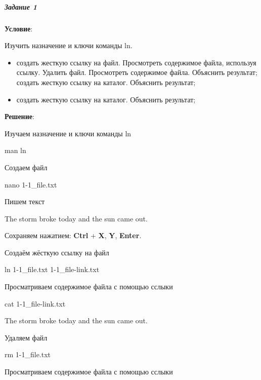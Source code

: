 \subparagraph{Задание 1} \textbf{Условие}:

Изучить назначение и ключи команды ln.

\begin{itemize}
    \item создать жесткую ссылку на файл. Просмотреть содержимое файла, используя
ссылку. Удалить файл. Просмотреть содержимое файла. Объяснить результат;
создать жесткую ссылку на каталог. Объяснить результат;
    \item создать жесткую ссылку на каталог. Объяснить результат;
\end{itemize}

\textbf{Решение}:

Изучаем назначение и ключи команды ln

\begin{BashBox}
    man ln
\end{BashBox}

Создаем файл

\begin{BashBox}
    nano 1-1_file.txt
\end{BashBox}

Пишем текст

\begin{BashBox}
    The storm broke today
    and the sun came out.
\end{BashBox}

Сохраняем нажатием: \textbf{Ctrl} + \textbf{X}, \textbf{Y}, \textbf{Enter}.

Создаём жёсткую ссылку на файл

\begin{BashBox}
    ln 1-1_file.txt 1-1_file-link.txt
\end{BashBox}

Просматриваем содержимое файла с помощью сслыки

\begin{BashBox}
    cat 1-1_file-link.txt
\end{BashBox}

\begin{OutBox}
    The storm broke today
    and the sun came out.
\end{OutBox}

Удаляем файл

\begin{BashBox}
    rm 1-1_file.txt
\end{BashBox}

Просматриваем содержимое файла с помощью сслыки

